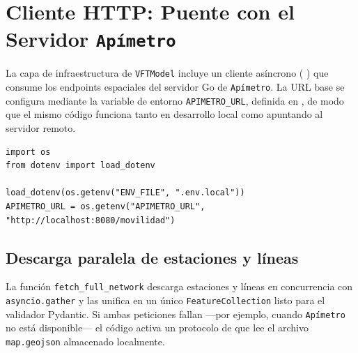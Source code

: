 
\section{Cliente HTTP: Puente con el Servidor \texorpdfstring{\texttt{Apímetro}}{Apímetro}}
\label{anx:vft-goclient}

La capa de infraestructura de \texttt{VFTModel} incluye un cliente asíncrono (
) que consume los endpoints
espaciales del servidor Go de \texttt{Apímetro}. La URL base se configura mediante la
variable de entorno \texttt{APIMETRO\_URL}, definida en
, de modo que el mismo código
funciona tanto en desarrollo local como apuntando al servidor remoto.

\begin{lstlisting}[style=estiloPython,
    caption={Configuración de la URL de Apimetro por variable de entorno.
             \texttt{src/infrastructure/go\_client/settings.py}.},
    label=lst:vft-settings]
import os
from dotenv import load_dotenv

load_dotenv(os.getenv("ENV_FILE", ".env.local"))
APIMETRO_URL = os.getenv("APIMETRO_URL", "http://localhost:8080/movilidad")
\end{lstlisting}

\subsection*{Descarga paralela de estaciones y líneas}

La función \texttt{fetch\_full\_network} descarga estaciones y líneas en
concurrencia con \texttt{asyncio.gather} y las unifica en un único
\texttt{FeatureCollection} listo para el validador Pydantic. Si ambas peticiones
fallan ---por ejemplo, cuando \texttt{Apímetro} no está disponible--- el código activa un
protocolo de  que lee el archivo \texttt{map.geojson}
almacenado localmente.

